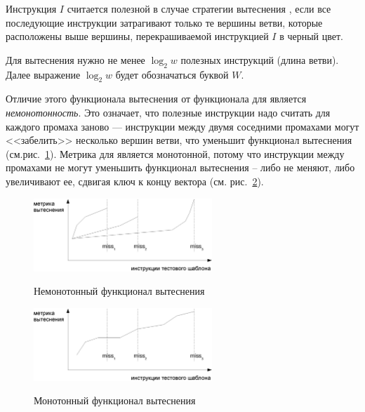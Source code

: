 %

\begin{utv}
Инструкция $I$ считается полезной в случае стратегии вытеснения
\PseudoLRU, если все последующие инструкции затрагивают только те
вершины ветви, которые расположены выше вершины, перекрашиваемой инструкцией $I$
в черный цвет.
\end{utv}

Для вытеснения нужно не менее $\log_2 w$ полезных инструкций (длина ветви).
Далее выражение $\log_2 w$ будет обозначаться буквой $W$.

Отличие этого функционала вытеснения от функционала для \LRU является \emph{немонотонность}. Это означает, что полезные инструкции надо считать для каждого промаха заново ---
инструкции между двумя соседними промахами могут <<забелить>>
несколько вершин ветви, что уменьшит функционал вытеснения
(см.рис.~\ref{nonmonotonic}). Метрика для \LRU является монотонной,
потому что инструкции между промахами не могут уменьшить функционал вытеснения -- либо не меняют, либо увеличивают ее, сдвигая ключ к концу вектора \LRU (см. рис.~\ref{monotonic}).


\begin{figure}[h] \center
  \includegraphics[width=0.6\textwidth]{2.theor/nonmonotonic}\\
  \caption{Немонотонный функционал вытеснения}\label{nonmonotonic}
\end{figure}

\begin{figure}[h] \center
  \includegraphics[width=0.6\textwidth]{2.theor/monotonic}\\
  \caption{Монотонный функционал вытеснения}\label{monotonic}
\end{figure}

